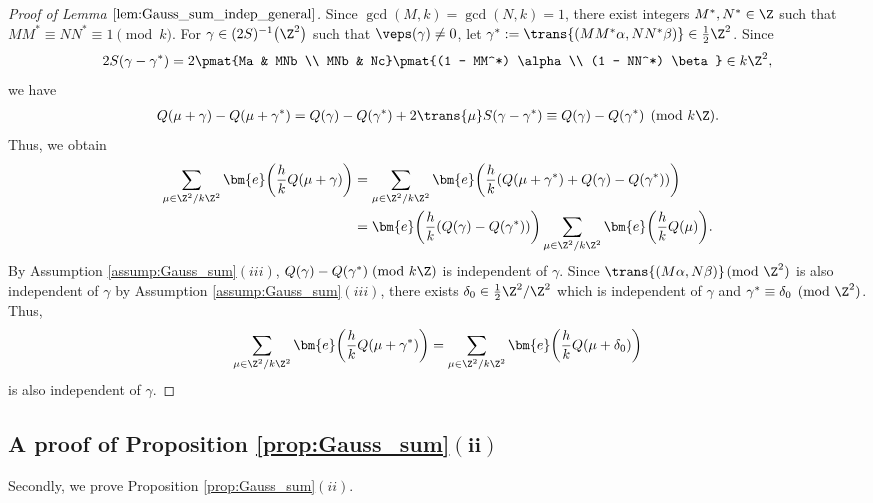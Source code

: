 \begin{proof}[Proof of Lemma $ \ref{lem:Gauss_sum_indep_general} $]
	Since $ \gcd(M, k) = \gcd(N, k) = 1 $, there exist integers $ M^*, N^* \in \Z $ such that $ MM^* \equiv NN^* \equiv 1 \pmod k $.
	For $ \gamma \in (2S)^{-1}\big(\Z^2\big) $ such that $ \veps(\gamma) \neq 0 $,
	let $ \gamma^* := \trans{(MM^* \alpha, NN^* \beta)} \in \frac{1}{2} \Z^2 $.
	Since
	\begin{gather*}
	2 S (\gamma - \gamma^*)
	= 2 \pmat{Ma & MNb \\ MNb & Nc} \pmat{(1 - MM^*) \alpha \\ (1 - NN^*) \beta}
	\in k\Z^2,
	\end{gather*}
	we have
	\begin{gather*}
	Q(\mu + \gamma) - Q(\mu + \gamma^*)
	= Q(\gamma) - Q(\gamma^*) + 2 \trans{\mu} S (\gamma - \gamma^*)
	\equiv Q(\gamma) - Q(\gamma^*) \pmod{k\Z}.
	\end{gather*}
	Thus, we obtain
	\begin{align*}
		\sum_{\mu \in \Z^2/k\Z^2} \bm{e}\bigg( \frac{h}{k} Q(\mu + \gamma) \bigg)
		&= \sum_{\mu \in \Z^2/k\Z^2} \bm{e}\bigg( \frac{h}{k} ( Q(\mu + \gamma^*) + Q(\gamma) - Q(\gamma^*) ) \bigg)
\\
		&= \bm{e}\bigg( \frac{h}{k} ( Q(\gamma) - Q(\gamma^*)) \bigg)
		\sum_{\mu \in \Z^2/k\Z^2} \bm{e}\bigg( \frac{h}{k} Q(\mu) \bigg).
	\end{align*}
	By Assumption \ref{assump:Gauss_sum}$(iii)$, $ Q(\gamma) - Q(\gamma^*)\! \pmod{k\Z} $ is independent of $ \gamma $.
	Since $ \trans{(M\alpha, N\beta)} \!\!\pmod{\Z^2} $ is also independent of $ \gamma $ by Assumption \ref{assump:Gauss_sum}$(iii)$, there exists $ \delta_0 \in \frac{1}{2} \Z^2/\Z^2 $ which is independent of $ \gamma $ and $ \gamma^* \equiv \delta_0 \pmod{\Z^2} $.
	Thus,
	\begin{gather*}
	\sum_{\mu \in \Z^2/k\Z^2} \bm{e}\bigg( \frac{h}{k} Q(\mu + \gamma^*) \bigg)
	= \sum_{\mu \in \Z^2/k\Z^2} \bm{e}\bigg( \frac{h}{k} Q(\mu + \delta_0) \bigg)	
	\end{gather*}
	is also independent of $ \gamma $.
\end{proof}

\subsection[A proof of Proposition 4.2(ii)]{A proof of Proposition \ref{prop:Gauss_sum}$\boldsymbol{(ii)}$} %

Secondly, we prove Proposition \ref{prop:Gauss_sum}$(ii)$.

